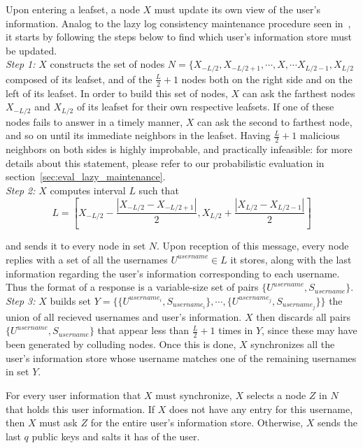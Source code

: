 Upon entering a leafset, a node $X$ must update its own view of the user's
information. Analog to the lazy log consistency maintenance procedure seen
in~\cite{p2p_certification}, it starts by following the steps below to find
which user's information store must be updated.\\

\textit{Step 1:} $X$ constructs the set of nodes
$N = \{ X_{-L/2}, X_{-L/2 +1}, \cdots, X, \cdots X_{L/2 -1}, X_{L/2} $
composed of its leafset, and of the $\frac{L}{2} +1$ nodes both on the right
side and on the left of its leafset. 
In order to build this set of nodes, $X$ can ask the farthest nodes $X_{-L/2}$
and $X_{L/2}$ of its leafset for their own respective leafsets. If one of these
nodes fails to answer in a timely manner, $X$ can ask the second to farthest
node, and so on until its immediate neighbors in the leafset. Having
$\frac{L}{2} +1$ malicious neighbors on both sides is highly improbable, and
practically infeasible: for more details about this statement, please refer to
our probabilistic evaluation in section~\eqref{sec:eval_lazy_maintenance}. \\

\textit{Step 2:} $X$ computes interval $L$ such that
$$
L = [ X_{-L/2} - \frac{| X_{-L/2} - X_{-L/2 +1} |}{2}, X_{L/2} +\frac{|
X_{L/2} - X_{L/2 -1} |}{2} ]
$$


and sends it to every node in set $N$. Upon reception of this message, every
node replies with a set of all the usernames $U^{username} \in L$ it
stores, along with the last information regarding the user's
information corresponding to each username. Thus the format of a response is a
variable-size set of pairs $\{ U^{username}, S_{username}\}$.\\


\textit{Step 3:} $X$ builds set 
$Y =  \{ \{U^{username_i}, S_{username_i}\},\cdots,\{ U^{username_j},
S_{username_j}\} \} $ the union of all recieved usernames and user's
information. $X$ then discards all pairs $\{ U^{username}, S_{username}\}$ that
appear less than $\frac{L}{2} +1$ times in $Y$, since these may have been
generated by colluding nodes. Once this is done, $X$ synchronizes all the
user's information store whose username matches one of the remaining usernames
in set $Y$.

For every user information that $X$ must synchronize, $X$ selects a node $Z$ in $N$ that
holds this user information. If $X$ does not have any entry for this username,
then $X$ must ask $Z$ for the entire user's information store. Otherwise, $X$
sends the last $q$ public keys and salts it has of the user.

